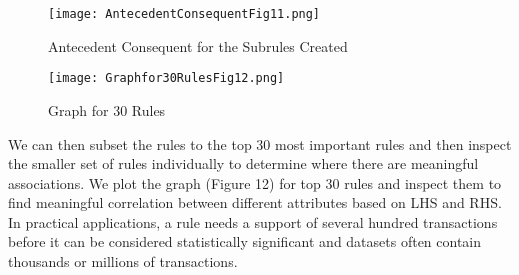 \documentclass{article}
\begin{document}
 \begin{figure}[h]
    \centering
    \texttt{[image: AntecedentConsequentFig11.png]}
    \caption{Antecedent Consequent for the Subrules Created}
    \label{fig:my_label}
\end{figure}

 \begin{figure}[h]
    \centering
    \texttt{[image: Graphfor30RulesFig12.png]}
    \caption{Graph for 30 Rules}
    \label{fig:my_label}
\end{figure}

We can then subset the rules to the top 30 most important rules and then inspect the smaller set of rules individually to determine where there are meaningful associations. We plot the graph (Figure 12) for top 30 rules and inspect them to find meaningful correlation between different attributes based on LHS and RHS. In practical applications, a rule needs a support of several hundred transactions before it can be considered statistically significant and datasets often contain thousands or millions of transactions.
\end{document}
